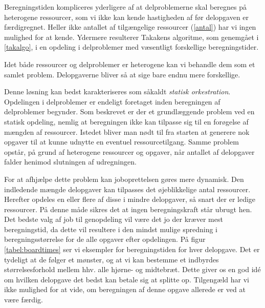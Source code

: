 \documentclass[pdf,draft,a4paper,11pt]{article}
\begin{document}
Beregningstiden kompliceres yderligere af at delproblemerne skal beregnes på heterogene ressourcer, som vi ikke kan kende hastigheden af før delopgaven er færdigregnet. Heller ikke antallet af tilgængelige ressourcer (\ref{antal}) har vi ingen mulighed for at kende. Ydermere resulterer Takakens algoritme, som genemgået i \ref{takalgo}, i en opdeling i delproblemer med væsentligt forskellige beregningstider.




Idet både ressourcer og delproblemer er heterogene kan vi behandle dem som et samlet problem. Delopgaverne bliver så at sige bare endnu mere forskellige.




Denne løsning kan bedst karakteriseres som såkaldt \emph{statisk orkestration}. Opdelingen i delproblemer er endeligt foretaget inden beregningen af delproblemer begynder. Som beskrevet er der et grundlæggende problem ved en statisk opdeling, nemlig at beregningen ikke kan tilpasse sig til en forøgelse af mængden af ressourcer. Istedet bliver man nødt til fra starten at generere nok opgaver til at kunne udnytte en eventuel ressourcetilgang. Samme problem opstår, på grund af heterogene ressourcer og opgaver, når antallet af delopgaver falder henimod slutningen af udregningen. 

For at afhjælpe dette problem kan joboprettelsen gøres mere dynamisk. Den indledende mængde delopgaver kan tilpasses det øjeblikkelige antal ressourcer. Herefter opdeles en eller flere af disse i mindre delopgaver, så snart der er ledige ressourcer. På denne måde sikres det at ingen beregningskraft står ubrugt hen. 
Det bedste valg af job til genopdeling vil være det jo der kræver mest beregningstid, da dette vil resultere i den mindst mulige spredning i beregningsstørrelse for de alle opgaver efter opdelingen. På figur \ref{tabel:boardtimes} ser vi eksempler for beregningstiden for hver delopgave. Det er tydeligt at de følger et mønster, og at vi kan bestemme et indbyrdes størrelsesforhold mellem hhv. alle hjørne- og midtebræt. Dette giver os en god idé om hvilken delopgave det bedst kan betale sig at splitte op. Tilgengæld har vi ikke mulighed for at vide, om beregningen af denne opgave allerede er ved at være færdig. 
\end{document}
